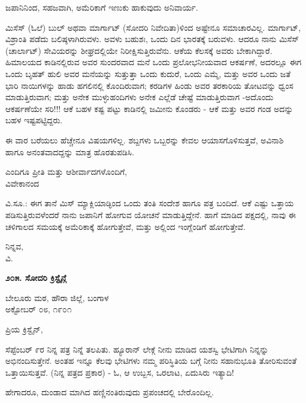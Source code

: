 ಜಪಾನಿನಿಂದ, ಸಹಜವಾಗಿ, ಅಮೆರಿಕಾಗೆ ಇಣುಕು ಹಾಕುವುದು ಅನಿವಾರ್ಯ.

ಮಿಸೆಸ್ (ಓಲೆ) ಬುಲ್ ಅಥವಾ ಮಾರ್ಗಾಟ್ (ಸೋದರಿ ನಿವೇದಿತಾ)ಳಿಂದ ಅಷ್ಟೇನೂ ಸಮಾಚಾರವಿಲ್ಲ. ಮಾರ್ಗಾಟ್, ವಿಶ್ರಾಂತಿ ಪಡೆದು ಬಲಿಷ್ಠಳಾಗಿರುವಳು. ಅವಳು ಬಹುಶಃ, ಒಂದು ದಿನ ಭಾರತಕ್ಕೆ ಬರುವಳು. ಆದರೂ ನಾನು ಮಿಸೆಸ್ (ಚಾರ್ಲಾಟ್) ಸೇವಿಯರನ್ನು ಶೀಘ್ರದಲ್ಲಿಯೇ ನಿರೀಕ್ಷಿಸುತ್ತಿರುವೆನು. ಆಕೆಯ ಕೆಲಸಕ್ಕೆ ಅವರು ಬೇಕಾಗಿದ್ದಾರೆ. ಹಿಮಾಲಯದ ಕಾಡಿನಲ್ಲಿರುವ ಅವರ ಸುಂದರವಾದ ಮನೆ ಒಂದು ಪ್ರಲೋಭನೀಯವಾದ ಆಕರ್ಷಣೆ, ಅದರಲ್ಲೂ ಈಗ ಒಂದು ಬೃಹತ್ ಹುಲಿ ಅವರ ಮನೆಯನ್ನು ಸುತ್ತುತ್ತಾ ಒಂದು ಕುದುರೆ, ಒಂದು ಎಮ್ಮೆ, ಮತ್ತು ಅವರ ಒಂದು ಜತೆ ಭಾರಿ ನಾಯಿಗಳನ್ನು ಹಾಡು ಹಗಲಿನಲ್ಲಿ ಕೊಂದಿರುವಾಗ; ಕರಡಿಗಳ ಹಿಂಡು ಅವರ ತರಕಾರಿಯ ತೋಟವನ್ನು ಧ್ವಂಸ ಮಾಡುತ್ತಿರುವಾಗ; ಮತ್ತು ಅನೇಕ ಮುಳ್ಳುಹಂದಿಗಳು ಅನೇಕ ಎಲ್ಲೆಡೆ ಚೇಷ್ಟೆ ಮಾಡುತ್ತಿರುವಾಗ -ಅದೊಂದು ಆಕರ್ಷಣೆಯೇ ಸರಿ!!! ಆಕೆ ಬಹಳ ಕಷ್ಟ ಪಟ್ಟು ಕಾಡಿನಲ್ಲಿ ಜಮೀನು ಕೊಂಡರು - ಆಕೆ ಮತ್ತು ಅವರ ಗಂಡ ಅದನ್ನು ಬಹಳ ಇಷ್ಟಪಟ್ಟಿದ್ದರು.

ಈ ವಾರ ಬರೆಯಲು ಹೆಚ್ಚೇನೂ ವಿಷಯಗಳಿಲ್ಲ. ಶಬ್ದಗಳು ಒಬ್ಬರನ್ನು ಕೇವಲ ಆಯಾಸಗೊಳಿಸುತ್ತವೆ, ಅವಿನಾಶಿ ಹಾಗೂ ಅನಂತವಾದದ್ದನ್ನು ಮಾತ್ರ ಹೊರತುಪಡಿಸಿ.

\begin{flushright}
ಎಂದಿಗೂ ಪ್ರೀತಿ ಮತ್ತು ಆಶೀರ್ವಾದಗಳೊಂದಿಗೆ,\\ವಿವೇಕಾನಂದ
\end{flushright}

ವಿ.ಸೂ.: ಈಗ ತಾನೆ ಮಿಸ್ ಮ್ಯಾಕ್ಲಿಯಾಡ್ಳಿಂದ ಒಂದು ತಂತಿ ಸಂದೇಶ ಹಾಗೂ ಪತ್ರ ಬಂದಿದೆ. ಆಕೆ ಎಷ್ಟು ಒತ್ತಾಯ ಪಡಿಸುತ್ತಿರುವಳೆಂದರೆ ನಾನು ಜಪಾನಿಗೆ ಹೋಗುವ ಯೋಚನೆ ಮಾಡುತ್ತಿದ್ದೇನೆ. ಹಾಗೆ ಮಾಡಿದ ಪಕ್ಷದಲ್ಲಿ, ನಾವು ಈ ಚಳಿಗಾಲದ ಸಮಯಕ್ಕೆ ಅಮೆರಿಕಾಕ್ಕೆ ಹೋಗುತ್ತೇವೆ, ಮತ್ತು ಅಲ್ಲಿಂದ ಇಂಗ್ಲೆಂಡಿಗೆ ಹೋಗುತ್ತೇವೆ.

\begin{flushright}
ನಿನ್ನವ,\\ವಿ.
\end{flushright}

\begin{center}
\textbf{೨೦೫. ಸೋದರಿ ಕ್ರಿಸ್ಟೈನ್ಗೆ}
\end{center}

\begin{flushright}
ಬೇಲೂರು ಮಠ, ಹೌರಾ ಜಿಲ್ಲೆ, ಬಂಗಾಳ\\ಅಕ್ಟೋಬರ್ ೦೮, ೧೯೦೧
\end{flushright}

ಪ್ರಿಯ ಕ್ರಿಸ್ಟೈನ್,

ಸೆಪ್ಟೆಂಬರ್ ೯ರ ನಿನ್ನ ಪತ್ರ ನಿನ್ನೆ ತಲಪಿತು. ಹ್ಯೂರಾನ್ ಲೇಕ್ಗೆ ನೀನು ಮಾಡಿದ ಯಶಸ್ವಿ ಭೇಟಿಗಾಗಿ ನಿನ್ನನ್ನು ಅಭಿನಂದಿಸುತ್ತೇನೆ. ಅಂತಹ ಇನ್ನೂ ಕೆಲವು ಭೇಟಿಗಳು ನಮ್ಮ ಪರಿಸ್ಥಿತಿಯ ಬಗ್ಗೆ ನೀನು ಸಹಾನುಭೂತಿ ತೋರಿಸುವಂತೆ ಒತ್ತಾಯಿಸುತ್ತವೆ. (ನಿನ್ನ ಪತ್ರದ ಪ್ರಕಾರ) - ಓ, ಆ ಉಬ್ಬಸ, ಒರಲಾಟ, ಏದುಸಿರು ಇತ್ಯಾದಿ!

ಹೇಗಾದರೂ, ದುಂಡಾದ ಮಾಗಿದ ಹಣ್ಣಿನಂತಿರುವುದು ಪ್ರಪಂಚದಲ್ಲಿ ಬೇರೊಂದಿಲ್ಲ.

